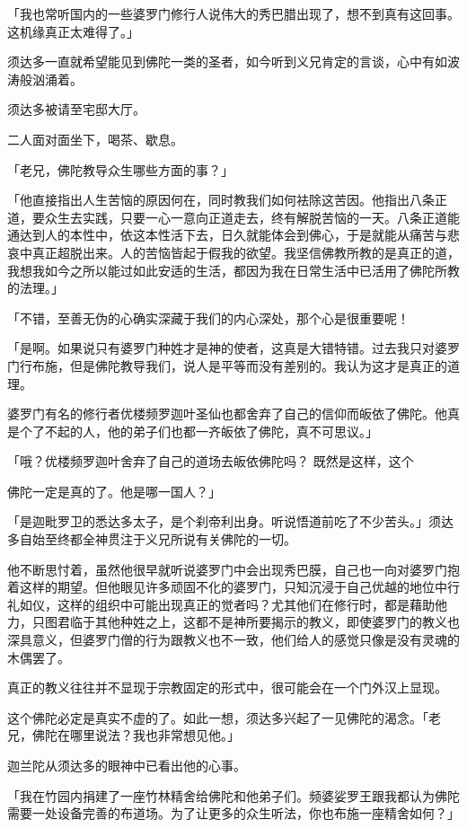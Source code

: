 \documentclass[twoside,openany]{book}
\begin{document}
「我也常听国内的一些婆罗门修行人说伟大的秀巴腊出现了，想不到真有这回事。这机缘真正太难得了。」

须达多一直就希望能见到佛陀一类的圣者，如今听到义兄肯定的言谈，心中有如波涛般汹涌着。

须达多被请至宅邸大厅。

二人面对面坐下，喝茶、歇息。

「老兄，佛陀教导众生哪些方面的事？」

「他直接指出人生苦恼的原因何在，同时教我们如何袪除这苦因。他指出八条正道，要众生去实践，只要一心一意向正道走去，终有解脱苦恼的一天。八条正道能通达到人的本性中，依这本性活下去，日久就能体会到佛心，于是就能从痛苦与悲哀中真正超脱出来。人的苦恼皆起于假我的欲望。我坚信佛教所教的是真正的道，我想我如今之所以能过如此安适的生活，都因为我在日常生活中已活用了佛陀所教的法理。」

「不错，至善无伪的心确实深藏于我们的内心深处，那个心是很重要呢！

「是啊。如果说只有婆罗门种姓才是神的使者，这真是大错特错。过去我只对婆罗门行布施，但是佛陀教导我们，说人是平等而没有差别的。我认为这才是真正的道理。

婆罗门有名的修行者优楼频罗迦叶圣仙也都舍弃了自己的信仰而皈依了佛陀。他真是个了不起的人，他的弟子们也都一齐皈依了佛陀，真不可思议。」

「哦？优楼频罗迦叶舍弃了自己的道场去皈依佛陀吗？	既然是这样，这个





佛陀一定是真的了。他是哪一国人？」

「是迦毗罗卫的悉达多太子，是个刹帝利出身。听说悟道前吃了不少苦头。」须达多自始至终都全神贯注于义兄所说有关佛陀的一切。

他不断思忖着，虽然他很早就听说婆罗门中会出现秀巴膜，自己也一向对婆罗门抱着这样的期望。但他眼见许多顽固不化的婆罗门，只知沉浸于自己优越的地位中行礼如仪，这样的组织中可能出现真正的觉者吗？尤其他们在修行时，都是藉助他力，只图君临于其他种姓之上，这都不是神所要揭示的教义，即使婆罗门的教义也深具意义，但婆罗门僧的行为跟教义也不一致，他们给人的感觉只像是没有灵魂的木偶罢了。

真正的教义往往并不显现于宗教固定的形式中，很可能会在一个门外汉上显现。

这个佛陀必定是真实不虚的了。如此一想，须达多兴起了一见佛陀的渴念。「老兄，佛陀在哪里说法？我也非常想见他。」

迦兰陀从须达多的眼神中已看出他的心事。

「我在竹园内捐建了一座竹林精舍给佛陀和他弟子们。频婆娑罗王跟我都认为佛陀需要一处设备完善的布道场。为了让更多的众生听法，你也布施一座精舍如何？」
\end{document}
